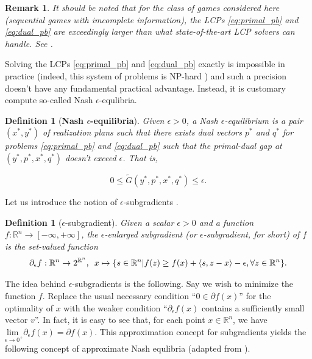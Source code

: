 \documentclass{article} %
\newtheorem{definition}[theorem]{Definition}
\newtheorem{remark}{Remark}
\begin{document}
\begin{remark}  
It should be noted that for the class of games considered here
(sequential games with imcomplete information), the LCPs
\eqref{eq:primal_pb} and \eqref{eq:dual_pb} are exceedingly larger
than what state-of-the-art LCP solvers can handle. See
\cite{hoda2010smoothing}.

\end{remark}

Solving the LCPs \eqref{eq:primal_pb} and \eqref{eq:dual_pb} exactly
is impossible in practice (indeed, this system of problems is NP-hard
\cite{koller1992complexity}) and such a
precision doesn't have any fundamental practical advantage. Instead, it is
customary compute so-called Nash $\epsilon$-equlibria.


\begin{definition}[\textbf{Nash $\epsilon$-equilibria}]
Given $\epsilon > 0$, a Nash $\epsilon$-equilibrium is
a pair $(x^*, y^*)$ of realization plans such that there exists dual
vectors $p^*$ and $q^*$ for problems \eqref{eq:primal_pb} and
\eqref{eq:dual_pb} such that the primal-dual gap at $(y^*, p^*, x^*, q^*)$
doesn't exceed $\epsilon$. That is,

\begin{equation}
  0 \le \tilde{G}(y^*, p^*, x^*, q^*) \le \epsilon.
\label{eq:approx_pb}
\end{equation}
\label{thm:approx_nash}
\end{definition}

Let us introduce the notion of $\epsilon$-subgradients
\cite{he2013accelerating}.

\begin{definition}[$\epsilon$-subgradient]
Given a scalar $\epsilon > 0$ and a function $f:\mathbb{R}^n
\rightarrow [-\infty,+\infty]$, the $\epsilon$-enlarged subgradient (or
$\epsilon$-subgradient, for short) of $f$ is the set-valued function
\begin{eqnarray}
\partial_\epsilon f: \mathbb{R}^n \rightarrow
2^{\mathbb{R}^n}, \hspace{.5em} x \mapsto \{s \in \mathbb{R}^n | f(z)
\ge f(x) + \langle s, z - x\rangle - \epsilon,\forall z \in
\mathbb{R}^n\}.
\end{eqnarray}
\end{definition}

The idea behind $\epsilon$-subgradients is the following. Say we wish
to minimize the function $f$. Replace the usual necessary
condition ``$0 \in \partial f(x)$'' for the optimality of $x$ with the
weaker condition ``$\partial_\epsilon f(x)$ contains a sufficiently
small vector $v$''. In fact, it is easy to see that, for each
point $x \in \mathbb{R}^n$, we have $\underset{\epsilon \rightarrow
  0^+}{\text{lim }}\partial_\epsilon f(x) = \partial f(x)$.
This approximation concept for subgradients yields the following
concept of approximate Nash equlibria (adapted from
\cite{he2013accelerating}).
\end{document}
